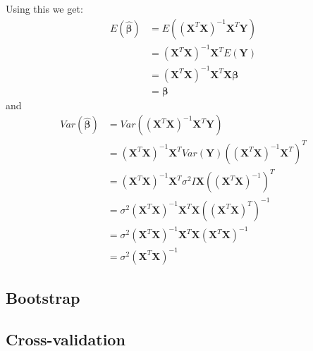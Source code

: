 \documentclass{article}
\begin{document}
Using this we get:
\begin{align*}
    E(\mathbf{\hat{\beta}}) & = E((\mathbf{X}^T \mathbf{X})^{-1} \mathbf{X}^T \mathbf{Y})             \\
                            & = (\mathbf{X}^T \mathbf{X})^{-1} \mathbf{X}^T E(\mathbf{Y})             \\
                            & = (\mathbf{X}^T \mathbf{X})^{-1} \mathbf{X}^T \mathbf{X} \mathbf{\beta} \\
                            & = \mathbf{\beta}
\end{align*}
and
\begin{align*}
    Var(\mathbf{\hat{\beta}}) & = Var((\mathbf{X}^T \mathbf{X})^{-1} \mathbf{X}^T \mathbf{Y})                                                              \\
                              & = (\mathbf{X}^T \mathbf{X})^{-1} \mathbf{X}^T Var(\mathbf{Y}) \left( (\mathbf{X}^T \mathbf{X})^{-1} \mathbf{X}^T \right)^T \\
                              & = (\mathbf{X}^T \mathbf{X})^{-1} \mathbf{X}^T \sigma^2 I \mathbf{X} \left( (\mathbf{X}^T \mathbf{X})^{-1} \right)^T        \\
                              & = \sigma^2 (\mathbf{X}^T \mathbf{X})^{-1} \mathbf{X}^T \mathbf{X} \left((\mathbf{X}^T \mathbf{X})^T \right)^{-1}           \\
                              & = \sigma^2 (\mathbf{X}^T \mathbf{X})^{-1} \mathbf{X}^T \mathbf{X} (\mathbf{X}^T \mathbf{X})^{-1}                           \\
                              & = \sigma^2 (\mathbf{X}^T \mathbf{X})^{-1}
\end{align*}

\subsection{Bootstrap}

\subsection{Cross-validation}


\end{document}
